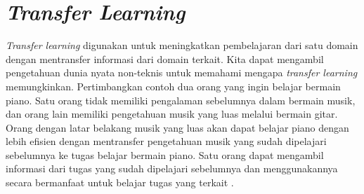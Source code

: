 








\section{\textit{Transfer Learning}}

\par \textit{Transfer learning} digunakan untuk meningkatkan pembelajaran dari satu domain dengan mentransfer informasi dari domain terkait. Kita dapat mengambil pengetahuan dunia nyata non-teknis untuk memahami mengapa \textit{transfer learning} memungkinkan. Pertimbangkan contoh dua orang yang ingin belajar bermain piano. Satu orang tidak memiliki pengalaman sebelumnya dalam bermain musik, dan orang lain memiliki pengetahuan musik yang luas melalui bermain gitar. Orang dengan latar belakang musik yang luas akan dapat belajar piano dengan lebih efisien dengan mentransfer pengetahuan musik yang sudah dipelajari sebelumnya ke tugas belajar bermain piano. Satu orang dapat mengambil informasi dari tugas yang sudah dipelajari sebelumnya dan menggunakannya secara bermanfaat untuk belajar tugas yang terkait \citep{pan2009survey}.


